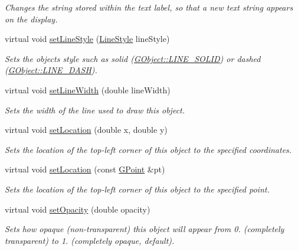 \begin{DoxyCompactItemize}
\begin{DoxyCompactList}\small\item\em Changes the string stored within the text label, so that a new text string appears on the display. \end{DoxyCompactList}\item 
virtual void \mbox{\hyperlink{classsgl_1_1GObject_add11575087eb94f1a71faa3f826c6341}{set\+Line\+Style}} (\mbox{\hyperlink{classsgl_1_1GObject_a86e0f5648542856159bb40775c854aa7}{Line\+Style}} line\+Style)
\begin{DoxyCompactList}\small\item\em Sets the object\textquotesingle{}s style such as solid (\mbox{\hyperlink{classsgl_1_1GObject_a86e0f5648542856159bb40775c854aa7a700c78bc2cd76acaab26651bf7b4941f}{G\+Object\+::\+L\+I\+N\+E\+\_\+\+S\+O\+L\+ID}}) or dashed (\mbox{\hyperlink{classsgl_1_1GObject_a86e0f5648542856159bb40775c854aa7a9ccba0845f785d81d07b333ae1aad84e}{G\+Object\+::\+L\+I\+N\+E\+\_\+\+D\+A\+SH}}). \end{DoxyCompactList}\item 
virtual void \mbox{\hyperlink{classsgl_1_1GObject_afd6a47c6ea6a1f85ca05a65ba3ff3477}{set\+Line\+Width}} (double line\+Width)
\begin{DoxyCompactList}\small\item\em Sets the width of the line used to draw this object. \end{DoxyCompactList}\item 
virtual void \mbox{\hyperlink{classsgl_1_1GObject_a04594e8ba9b98513a64f1da00dcae18c}{set\+Location}} (double x, double y)
\begin{DoxyCompactList}\small\item\em Sets the location of the top-\/left corner of this object to the specified coordinates. \end{DoxyCompactList}\item 
virtual void \mbox{\hyperlink{classsgl_1_1GObject_aa8480c0b7166cdf8f784cece06ab353f}{set\+Location}} (const \mbox{\hyperlink{structsgl_1_1GPoint}{G\+Point}} \&pt)
\begin{DoxyCompactList}\small\item\em Sets the location of the top-\/left corner of this object to the specified point. \end{DoxyCompactList}\item 
virtual void \mbox{\hyperlink{classsgl_1_1GObject_a04af1866cc1bae4a1226695794a50539}{set\+Opacity}} (double opacity)
\begin{DoxyCompactList}\small\item\em Sets how opaque (non-\/transparent) this object will appear from 0. (completely transparent) to 1. (completely opaque, default). \end{DoxyCompactList}\item 

\end{DoxyCompactItemize}
